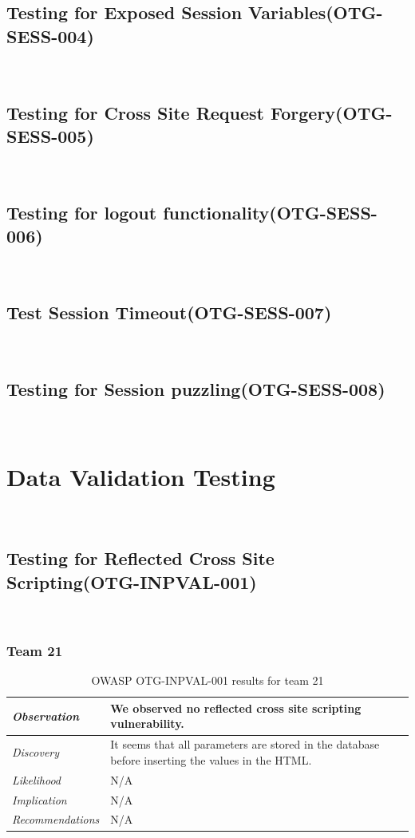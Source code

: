 \documentclass[headsepline,footsepline,footinclude=false,oneside,fontsize=11pt,paper=a4,listof=totoc,bibliography=totoc]{scrbook} %
\begin{document}
\subsection{Testing for Exposed Session Variables(OTG-SESS-004)}\
\pagebreak 
\subsection{Testing for Cross Site Request Forgery(OTG-SESS-005)}\
\pagebreak 
\subsection{Testing for logout functionality(OTG-SESS-006)}\
\pagebreak 
\subsection{Test Session Timeout(OTG-SESS-007)}\
\pagebreak 
\subsection{Testing for Session puzzling(OTG-SESS-008)}\ 

\pagebreak 
\section{Data Validation Testing}\
\subsection{Testing for Reflected Cross Site Scripting(OTG-INPVAL-001)}\

\subsubsection{Team 21}

\begin{table}[H]
	\centering
	\begin{tabular}{l p{11cm}} 
		\textit{Observation} & We observed no reflected cross site scripting vulnerability. \\ 
		\hline
		\textit{Discovery} &  It seems that all parameters are stored in the database before inserting the values in the HTML. \\
		\hline
		\textit{Likelihood} & N/A\\
		\hline
		\textit{Implication} & N/A\\
		\hline
		\textit{Recommendations} & N/A\\ 
	\end{tabular}
	\caption{OWASP OTG-INPVAL-001 results for team 21}
	\label{table:scenario2}
\end{table}
\end{document}
